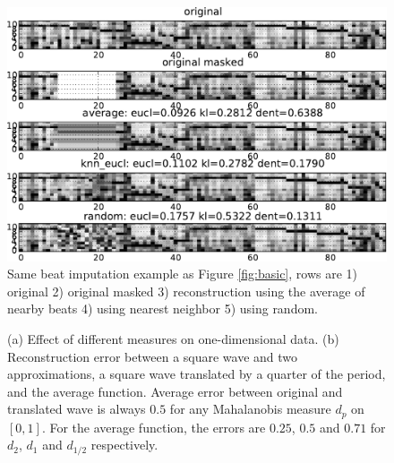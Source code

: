 \documentclass{article}
\begin{document}
\begin{figure}[t]
\begin{center}
\includegraphics[width=.95\columnwidth]{avg_nn_rand}
\end{center}
\caption{Same beat imputation example as Figure \ref{fig:basic}, 
rows are 1) original 2) original masked
3) reconstruction using the average of nearby beats 4) using
nearest neighbor 5) using random.
\label{fig:avgnnrand}}
\end{figure}


\begin{figure}%
\centering
{} 
\hspace{0.1cm}
%
\hspace{8pt}%
\caption{(a) Effect of different measures on one-dimensional data. (b)
  Reconstruction error between a square wave and two approximations, a
  square wave translated by a quarter of the period, and the average
  function. Average error between original and translated wave is
  always $0.5$ for any Mahalanobis measure $d_p$ on $[0,1]$.  For the
  average function, the errors are $0.25$, $0.5$ and $0.71$ for $d_2$,
  $d_1$ and $d_{1/2}$ respectively.}%
\label{fig:two_measures}
\end{figure}
\end{document}
